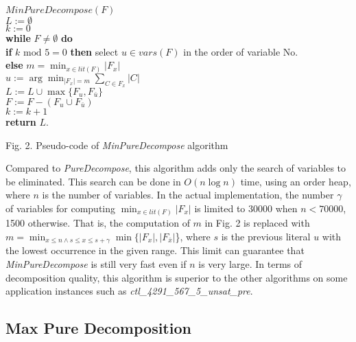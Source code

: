 \documentclass{llncs}
\begin{document}
\begin{flushleft}
\begin{sf}
\begin{footnotesize}
\hskip 12mm $MinPureDecompose (F)$\\
\hskip 16mm $ L := \emptyset $\\
\hskip 16mm $ k := 0 $\\
\hskip 16mm {\bf while } $ F \neq \emptyset $ {\bf do}\\
\hskip 20mm    {\bf if } $k$  $\mathrm{mod}$ $5 = 0 $ {\bf then }
select
$u \in vars(F)$ in the order of variable No. \\
\hskip 20mm    {\bf else} $ m = \min_{x \in lit(F)} |F_x|$\\
\hskip 27mm       $ u :=\arg \min_{|F_x|=m } \sum_{C \in F_x} |C|$\\
\hskip 20mm    $L := L \cup \max\{ F_u, F_{\bar u} \}$\\
\hskip 20mm    $F := F - (F_u \cup F_{\bar u})$\\
\hskip 20mm    $ k := k + 1 $\\
\hskip 16mm  {\bf return} $L$.

\vspace{1em}

\hskip 8mm \textrm{Fig. 2. Pseudo-code of \emph{MinPureDecompose}
algorithm}
\end{footnotesize}
\end{sf}
\end{flushleft}

Compared to \emph{PureDecompose}, this algorithm adds only the
search of variables to be eliminated. This search can be done in
$O(n \log n)$ time, using an order heap, where $n$ is the number of
variables. In the actual implementation, the number $\gamma$ of
variables for computing $\min_{x \in lit(F)} |F_x|$ is limited to
30000 when $n < 70000$, 1500 otherwise. That is, the computation of
$m$ in Fig. 2 is replaced with $ m = \min_{x \leq n \wedge s \leq x
\leq s+ \gamma} \min \{|F_x|,|F_{\bar x}|$\}, where $s$ is the
previous literal $u$ with the lowest occurrence in the given range.
This limit can guarantee that \emph{MinPureDecompose} is still very
fast even if $n$ is very large. In terms of decomposition quality,
this algorithm is superior to the other algorithms on some
application instances such as \emph{ctl\_4291\_567\_5\_unsat\_pre}.


\subsection{Max Pure Decomposition}
\end{document}
